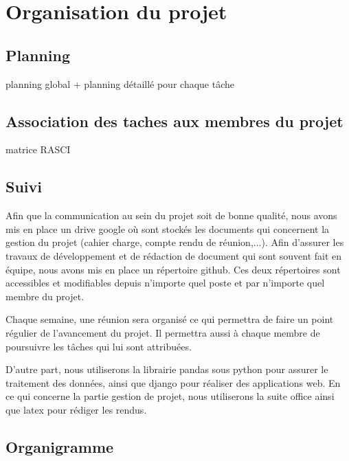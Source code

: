 \chapter*{Organisation du projet}
\label{sec:organisation}
\section*{Planning}
planning global + planning détaillé pour chaque tâche
\section*{Association des taches aux membres du projet}
matrice RASCI
\section*{Suivi}
Afin que la communication au sein du projet soit de bonne qualité, nous avons mis en place un drive google où sont stockés les documents qui concernent la gestion du projet (cahier charge, compte rendu de réunion,...). Afin d'assurer les travaux de développement et de rédaction de document qui sont souvent fait en équipe, nous avons mis en place un répertoire github. Ces deux répertoires sont accessibles et modifiables depuis n'importe quel poste et par n'importe quel membre du projet. 

Chaque semaine, une réunion sera organisé ce qui permettra de faire un point régulier de l'avancement du projet. Il permettra aussi à chaque membre de poursuivre les tâches qui lui sont attribuées.

D'autre part, nous utiliserons la librairie pandas sous python pour assurer le traitement des données, ainsi que django pour réaliser des applications web. En ce qui concerne la partie gestion de projet, nous utiliserons la suite office ainsi que latex pour rédiger les rendus.

\section*{Organigramme}


